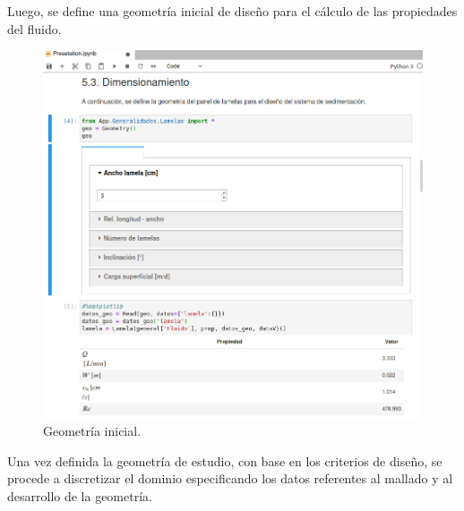 \newpage

\noindent
\justify

Luego, se define una geometr\'ia inicial de dise\~no para el c\'alculo de las propiedades del fluido.

\begin{figure}[h!]
	\centering
	\includegraphics[width=\textwidth]{Images/Anexos/5.png}
	\caption{Geometr\'ia inicial.}
	\label{geoSoft}
\end{figure}

\newpage

\noindent
\justify

Una vez definida la geometr\'ia de estudio, con base en los criterios de dise\~no, se procede a discretizar el dominio especificando los datos referentes al mallado y al desarrollo de la geometr\'ia.

